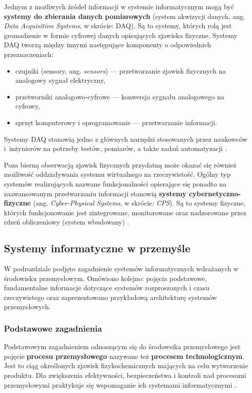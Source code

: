\documentclass[a4paper, 12pt, twoside]{article}
\begin{document}
Jednym z możliwych źródeł informacji w systemie informatycznym mogą być 
\textbf{systemy do zbierania danych pomiarowych} (system akwizycji danych, ang. \emph{Data Acquisition Systems}, w skrócie: DAQ).
Są to systemy, których rolą jest gromadzenie w formie cyfrowej danych opisujących 
zjawiska fizyczne. Systemy DAQ tworzą między innymi następujące komponenty
o odpowiednich przeznaczeniach:
\begin{itemize}
    \itemsep0em 
    \item czujniki (sensory, ang. \emph{sensors}) --- przetwarzanie zjawisk fizycznych na analogowy sygnał elektryczny,
    \item przetworniki analogowo-cyfrowe --- konwersja sygnału analogowego na cyfrowy,
    \item sprzęt komputerowy i oprogramowanie --- przetwarzanie informacji. 
\end{itemize}
Systemy DAQ stanowią jedno z głównych narzędzi stosowanych przez naukowców i~inżynierów
na potrzeby testów, pomiarów, a także zadań automatyzacji \cite{data-aq-systems}.

Poza bierną obserwacją zjawisk fizycznych przydatną może okazać się również
możliwość oddziaływania systemu wirtualnego na rzeczywistość. Ogólny typ systemów
realizujących nazwane funkcjonalności opierające się ponadto na zaawansowanym przetwarzaniu informacji
stanowią \textbf{systemy cybernetyczno-fizyczne}
(ang. \emph{Cyber-Physical Systems}, w skrócie: \emph{CPS}).
Są to systemy fizyczne, których funkcjonowanie jest zintegrowane, monitorowane oraz 
nadzorowane przez rdzeń obliczeniowy (system wbudowany) \cite{iiot-cyber-manufacturing-systems}. 

\subsection{Systemy informatyczne w przemyśle} \label{isp}

W podrozdziale podjęto zagadnienie systemów informatycznych wdrażanych w środowisku przemysłowym.
Omówiono kolejno: pojęcia podstawowe, fundamentalne informacje dotyczące systemów rozproszonych i czasu rzeczywistego
oraz zaprezentowano przykładową architekturę systemów przemysłowych.

\subsubsection{Podstawowe zagadnienia}

Podstawowym zagadnieniem odnoszącym się do środowsika przemysłowego jest pojęcie
\textbf{procesu przemysłowego} nazywane też \textbf{procesem technologicznym}.
Jest to ciąg określonych zjawisk fizykochemicznych mających na celu wytworzenie
produktu. Dla zwiększenia efektywności, bezpieczeństwa i kontroli nad procesami
przemysłowymi praktykuje się wspomaganie ich systemami informatycznymi \cite{isp}.
\end{document}
